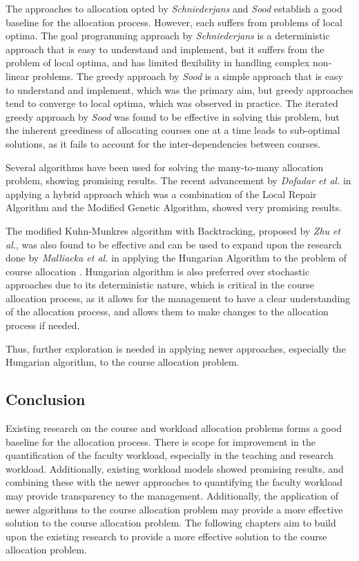 The approaches to allocation opted by \textit{Schniederjans} and \textit{Sood} establish a good baseline for the allocation process. However, each suffers from problems of local optima. The goal programming approach by \textit{Schniederjans} is a deterministic approach that is easy to understand and implement, but it suffers from the problem of local optima, and has limited flexibility in handling complex non-linear problems. The greedy approach by \textit{Sood} is a simple approach that is easy to understand and implement, which was the primary aim, but greedy approaches tend to converge to local optima, which was observed in practice. The iterated greedy approach by \textit{Sood} was found to be effective in solving this problem, but the inherent greediness of allocating courses one at a time leads to sub-optimal solutions, as it fails to account for the inter-dependencies between courses.

Several algorithms have been used for solving the many-to-many allocation problem, showing promising results. The recent advancement by \textit{Dofadar et al.} in applying a hybrid approach which was a combination of the Local Repair Algorithm and the Modified Genetic Algorithm, showed very promising results.

The modified Kuhn-Munkres algorithm with Backtracking, proposed by \textit{Zhu et al.}, was also found to be effective and can be used to expand upon the research done by \textit{Malliacka et al.} in applying the Hungarian Algorithm to the problem of course allocation \cite{dofadar2021hybrid, zhu2016solving, mallicka2021claps}. Hungarian algorithm is also preferred over stochastic approaches due to its deterministic nature, which is critical in the course allocation process, as it allows for the management to have a clear understanding of the allocation process, and allows them to make changes to the allocation process if needed.

Thus, further exploration is needed in applying newer approaches, especially the Hungarian algorithm, to the course allocation problem.

\subsection{Conclusion}

Existing research on the course and workload allocation problems forms a good baseline for the allocation process. There is scope for improvement in the quantification of the faculty workload, especially in the teaching and research workload. Additionally, existing workload models showed promising results, and combining these with the newer approaches to quantifying the faculty workload may provide transparency to the management. Additionally, the application of newer algorithms to the course allocation problem may provide a more effective solution to the course allocation problem. The following chapters aim to build upon the existing research to provide a more effective solution to the course allocation problem.
